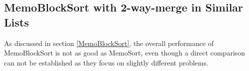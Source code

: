 \documentclass[a4paper,12pt]{article}
\begin{document}
\subsection{MemoBlockSort with 2-way-merge in Similar Lists}\label{MemoBlock2Res}

As discussed in section \ref{MemoBlockSort}, the overall performance of MemoBlockSort is not as good as MemoSort, even though a direct comparison can not be established as they focus on slightly different problems. \\

\begin{figure}[H]
\centering
{}%
\hfill %
%
\\ %
%
\hfill %

\end{figure}
\end{document}
